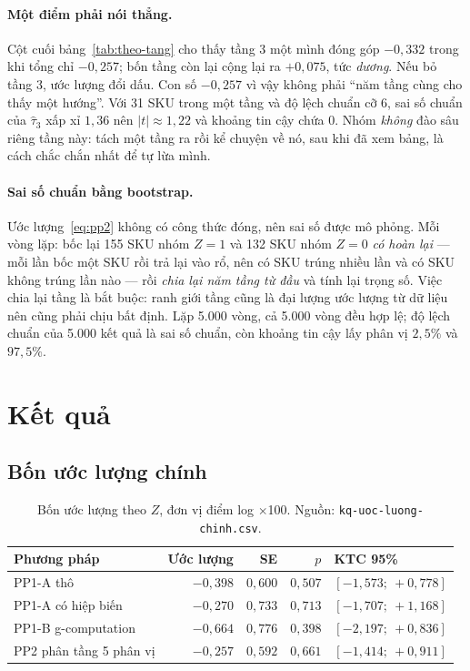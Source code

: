 \documentclass[11pt]{article}
\newcommand{\dvi}{điểm log $\times$100}
\begin{document}
\paragraph{Một điểm phải nói thẳng.} Cột cuối bảng~\ref{tab:theo-tang} cho thấy tầng 3 một mình
đóng góp $-0{,}332$ trong khi tổng chỉ $-0{,}257$; bốn tầng còn lại cộng lại ra $+0{,}075$, tức
\emph{dương}. Nếu bỏ tầng 3, ước lượng đổi dấu. Con số $-0{,}257$ vì vậy không phải ``năm tầng cùng
cho thấy một hướng''. Với 31 SKU trong một tầng và độ lệch chuẩn cỡ 6, sai số chuẩn của
$\hat\tau_3$ xấp xỉ $1{,}36$ nên $|t| \approx 1{,}22$ và khoảng tin cậy chứa 0. Nhóm \emph{không}
đào sâu riêng tầng này: tách một tầng ra rồi kể chuyện về nó, sau khi đã xem bảng, là cách chắc
chắn nhất để tự lừa mình.

\paragraph{Sai số chuẩn bằng bootstrap.} Ước lượng~\eqref{eq:pp2} không có công thức đóng, nên
sai số được mô phỏng. Mỗi vòng lặp: bốc lại 155 SKU nhóm $Z=1$ và 132 SKU nhóm $Z=0$ \emph{có hoàn
lại} --- mỗi lần bốc một SKU rồi trả lại vào rổ, nên có SKU trúng nhiều lần và có SKU không trúng
lần nào --- rồi \emph{chia lại năm tầng từ đầu} và tính lại trọng số. Việc chia lại tầng là bắt
buộc: ranh giới tầng cũng là đại lượng ước lượng từ dữ liệu nên cũng phải chịu bất định. Lặp 5.000
vòng, cả 5.000 vòng đều hợp lệ; độ lệch chuẩn của 5.000 kết quả là sai số chuẩn, còn khoảng tin cậy
lấy phân vị $2{,}5\%$ và $97{,}5\%$.

\section{Kết quả}
\label{sec:ket-qua}

\subsection{Bốn ước lượng chính}

\begin{table}[htbp]
  \centering
  \caption{Bốn ước lượng theo $Z$, đơn vị \dvi{}. Nguồn: \texttt{kq-uoc-luong-chinh.csv}.}
  \label{tab:bon-uoc-luong}
  \begin{tabular}{lrrrl}
    \toprule
    Phương pháp & Ước lượng & SE & $p$ & KTC 95\% \\
    \midrule
    PP1-A thô               & $-0{,}398$ & $0{,}600$ & $0{,}507$ & $[-1{,}573;\ +0{,}778]$ \\
    PP1-A có hiệp biến      & $-0{,}270$ & $0{,}733$ & $0{,}713$ & $[-1{,}707;\ +1{,}168]$ \\
    PP1-B g-computation     & $-0{,}664$ & $0{,}776$ & $0{,}398$ & $[-2{,}197;\ +0{,}836]$ \\
    PP2 phân tầng 5 phân vị & $-0{,}257$ & $0{,}592$ & $0{,}661$ & $[-1{,}414;\ +0{,}911]$ \\
    \bottomrule
  \end{tabular}
\end{table}
\end{document}
